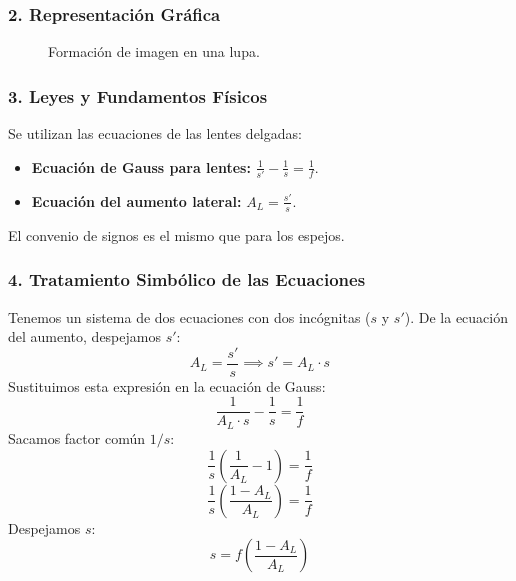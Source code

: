 \subsubsection*{2. Representación Gráfica}
\begin{figure}[H]
    \centering
    \caption{Formación de imagen en una lupa.}
\end{figure}

\subsubsection*{3. Leyes y Fundamentos Físicos}
Se utilizan las ecuaciones de las lentes delgadas:
\begin{itemize}
    \item \textbf{Ecuación de Gauss para lentes:} $\frac{1}{s'} - \frac{1}{s} = \frac{1}{f}$.
    \item \textbf{Ecuación del aumento lateral:} $A_L = \frac{s'}{s}$.
\end{itemize}
El convenio de signos es el mismo que para los espejos.

\subsubsection*{4. Tratamiento Simbólico de las Ecuaciones}
Tenemos un sistema de dos ecuaciones con dos incógnitas ($s$ y $s'$).
De la ecuación del aumento, despejamos $s'$:
$$A_L = \frac{s'}{s} \implies s' = A_L \cdot s$$
Sustituimos esta expresión en la ecuación de Gauss:
$$\frac{1}{A_L \cdot s} - \frac{1}{s} = \frac{1}{f}$$
Sacamos factor común $1/s$:
$$\frac{1}{s} \left( \frac{1}{A_L} - 1 \right) = \frac{1}{f}$$
$$\frac{1}{s} \left( \frac{1 - A_L}{A_L} \right) = \frac{1}{f}$$
Despejamos $s$:
$$s = f \left( \frac{1 - A_L}{A_L} \right)$$

